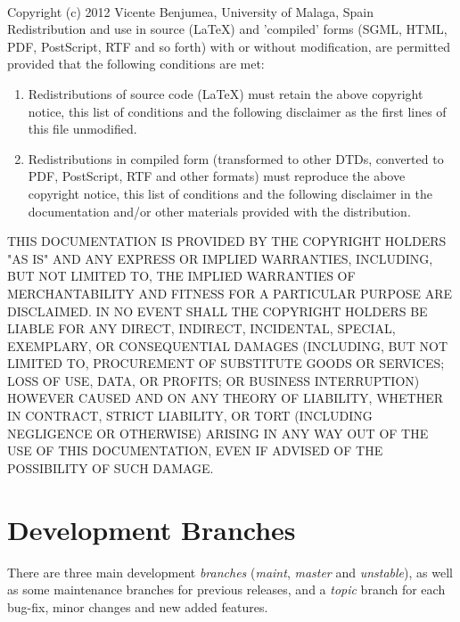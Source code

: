 \documentclass[a4paper]{article}
\begin{document}
\begin{minipage}{\linewidth}\scriptsize
\hrulefill\\
\noindent
Copyright (c)  2012  Vicente Benjumea, University of Malaga, Spain\\

\noindent
Redistribution and use in source (LaTeX) and 'compiled' forms
(SGML, HTML, PDF, PostScript, RTF and so forth) with or without
modification, are permitted provided that the following conditions are
met:
\begin{enumerate}
\item Redistributions of source code (LaTeX) must retain the
      above copyright notice, this list of conditions and the
      following disclaimer as the first lines of this file unmodified.

\item Redistributions in compiled form (transformed to other DTDs,
      converted to PDF, PostScript, RTF and other formats) must
      reproduce the above copyright notice, this list of conditions
      and the following disclaimer in the documentation and/or other
      materials provided with the distribution.
\end{enumerate}
THIS DOCUMENTATION IS PROVIDED BY THE COPYRIGHT HOLDERS "AS IS" AND
ANY EXPRESS OR IMPLIED WARRANTIES, INCLUDING, BUT NOT LIMITED TO, THE
IMPLIED WARRANTIES OF MERCHANTABILITY AND FITNESS FOR A PARTICULAR
PURPOSE ARE DISCLAIMED. IN NO EVENT SHALL THE COPYRIGHT HOLDERS BE
LIABLE FOR ANY DIRECT, INDIRECT, INCIDENTAL, SPECIAL, EXEMPLARY, OR
CONSEQUENTIAL DAMAGES (INCLUDING, BUT NOT LIMITED TO, PROCUREMENT OF
SUBSTITUTE GOODS OR SERVICES; LOSS OF USE, DATA, OR PROFITS; OR
BUSINESS INTERRUPTION) HOWEVER CAUSED AND ON ANY THEORY OF LIABILITY,
WHETHER IN CONTRACT, STRICT LIABILITY, OR TORT (INCLUDING NEGLIGENCE
OR OTHERWISE) ARISING IN ANY WAY OUT OF THE USE OF THIS DOCUMENTATION,
EVEN IF ADVISED OF THE POSSIBILITY OF SUCH DAMAGE.
\end{minipage}
\newpage
\section{Development Branches}

There are three main development \emph{branches} (\emph{maint},
\emph{master} and \emph{unstable}), as well as some maintenance
branches for previous releases, and a \emph{topic} branch for each 
bug-fix, minor changes and new added features.
\end{document}
